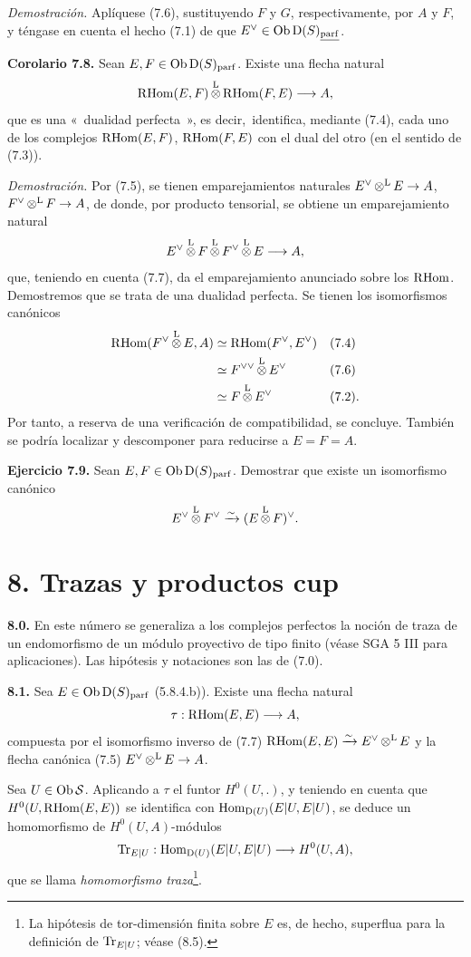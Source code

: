\emph{Demostración.} Aplíquese (7.6), sustituyendo \(F\) y \(G\), respectivamente, por \(A\) y \(F\), y téngase en cuenta el hecho (7.1) de que \(E^\vee\in\Ob\Dpx(S)_{\underline{\mathrm{parf}}}\).

\textbf{Corolario 7.8.} Sean \(E,F\in\Ob\Dpx(S)_{\mathrm{parf}}\). Existe una flecha natural
\[
  \RHom(E,F)\otL\RHom(F,E)\longrightarrow A,
\]
que es una «~dualidad perfecta~», es decir,\ identifica, mediante (7.4), cada uno de los complejos \(\RHom(E,F)\), \(\RHom(F,E)\) con el dual del otro (en el sentido de (7.3)).

\emph{Demostración.} Por (7.5), se tienen emparejamientos naturales \(E^\vee\otL E\to A\), \(F^\vee\otL F\to A\), de donde, por producto tensorial, se obtiene un emparejamiento natural
\[
  E^\vee\otL F\otL F^\vee\otL E\longrightarrow A,
\]
que, teniendo en cuenta (7.7), da el emparejamiento anunciado sobre los \(\RHom\). Demostremos que se trata de una dualidad perfecta. Se tienen los isomorfismos canónicos
\[
\begin{aligned}
\RHom(F^\vee\otL E,A)&\simeq\RHom(F^\vee,E^\vee) &&(7.4)\\
&\simeq F^{\vee\vee}\otL E^\vee &&(7.6)\\
&\simeq F\otL E^\vee &&(7.2).
\end{aligned}
\]
Por tanto, a reserva de una verificación de compatibilidad, se concluye. También se podría localizar y descomponer para reducirse a \(E=F=A\).


\textbf{Ejercicio 7.9.} Sean \(E,F\in\Ob\Dpx(S)_{\mathrm{parf}}\). Demostrar que existe un isomorfismo canónico
\[
  E^\vee\otL F^\vee \xrightarrow{\sim} (E\otL F)^\vee .
\]

\section*{8. Trazas y productos cup}

\textbf{8.0.} En este número se generaliza a los complejos perfectos la noción de traza de un endomorfismo de un módulo proyectivo de tipo finito (véase SGA 5 III para aplicaciones). Las hipótesis y notaciones son las de (7.0).

\textbf{8.1.} Sea \(E\in\Ob\Dpx(S)_{\parf}\) (5.8.4.b)). Existe una flecha natural
\[
  \tau:\RHom(E,E)\longrightarrow A,
\]
compuesta por el isomorfismo inverso de (7.7) \(\RHom(E,E)\xrightarrow{\sim}E^\vee\otL E\) y la flecha canónica (7.5) \(E^\vee\otL E\to A\).

Sea \(U\in\Ob \sisi{S}{\mathcal S}\). Aplicando a \(\tau\) el funtor \(H^0(U,.)\), y teniendo en cuenta que \(H^0(U,\RHom(E,E))\) se identifica con \(\Hom_{\Dpx(U)}(E|U,E|U)\), se deduce un homomorfismo de \(H^0(U,A)\)-módulos
\[
  \Tr_{E|U}:\Hom_{\Dpx(U)}(E|U,E|U)\longrightarrow H^0(U,A),
\]
que se llama \emph{homomorfismo traza}\footnote{La hipótesis de tor-dimensión finita sobre \(E\) es, de hecho, superflua para la definición de \(\Tr_{E|U}\); véase (8.5).}.

